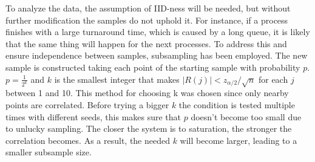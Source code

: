 To analyze the data, the assumption of IID-ness will be needed, but without further modification the samples do not uphold it. For instance, if a process finishes with a large turnaround time, which is caused by a long queue, it is likely that the same thing will happen for the next processes.
To address this and ensure independence between samples, subsampling has been employed. The new sample is constructed taking each point of the starting sample with probability $p$. $p = \frac{1}{2^k}$ and $k$ is the smallest integer that makes $|R(j)| < z_{\alpha/2}/\sqrt{n}$ for each $j$ between 1 and 10.  
This method for choosing k was chosen since only nearby points are correlated.
Before trying a bigger $k$ the condition is tested multiple times with different seeds, this makes sure that $p$ doesn't become too small due to unlucky sampling.
The closer the system is to saturation, the stronger the correlation becomes. As a result, the needed $k$ will become larger, leading to a smaller subsample size.


